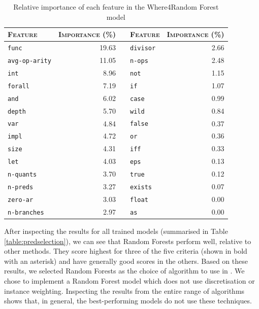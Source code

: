 \begin{table}
	\caption[Relative importance of features for \where]{Relative importance of each feature in the \textsf{Where4}Random Forest model}
	
	
	\begin{tabularx}{\textwidth}{@{}lr|c|lr@{}}
		\toprule
		\textsc{Feature} & \textsc{Importance (\%)} & & 
		\textsc{Feature} & \textsc{Importance (\%)}  \\
		\midrule
		\texttt{func} & 19.63 & & \texttt{divisor} & 2.66 \\
		\texttt{avg-op-arity} &  11.05 & & \texttt{n-ops} & 2.48 \\
		\texttt{int} & 8.96 & & \texttt{not} & 1.15 \\
		\texttt{forall} & 7.19 & & \texttt{if} & 1.07 \\
		\texttt{and} & 6.02 & & \texttt{case} & 0.99 \\
		\texttt{depth} & 5.70 & & \texttt{wild} & 0.84 \\
		\texttt{var} & 4.84 & & \texttt{false} & 0.37 \\
		\texttt{impl} & 4.72 & & \texttt{or} & 0.36 \\
		\texttt{size} & 4.31 & & \texttt{iff} & 0.33 \\
		\texttt{let} & 4.03 & & \texttt{eps} & 0.13 \\
		\texttt{n-quants} & 3.70 & & \texttt{true} & 0.12 \\
		\texttt{n-preds} & 3.27 & & \texttt{exists} & 0.07 \\
		\texttt{zero-ar} & 3.03 & & \texttt{float} & 0.00 \\
		\texttt{n-branches} & 2.97 & & \texttt{as} & 0.00 \\
		\bottomrule	
	\end{tabularx}
	\label{table:importances}
\end{table}


After inspecting the results for all trained models (summarised in Table \ref{table:predselection}), we can see that Random Forests \cite{RandomForests} perform well, relative to other methods. 
They score highest for three of the five criteria (shown in bold with an asterisk) and have generally good scores in the others.
Based on these results, we selected Random Forests as the choice of algorithm to use in \where.
We chose to implement a Random Forest model which does not use discretisation or instance weighting. 
Inspecting the results from the entire range of algorithms shows that, in general, the best-performing models do not use these techniques.


